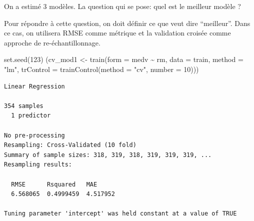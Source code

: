 \documentclass[
  8pt,
  ignorenonframetext,
]{beamer}
\newenvironment{Shaded}{\begin{snugshade}}{\end{snugshade}}
\newcommand{\AttributeTok}[1]{\textcolor[rgb]{0.77,0.63,0.00}{#1}}
\newcommand{\DecValTok}[1]{\textcolor[rgb]{0.00,0.00,0.81}{#1}}
\newcommand{\FunctionTok}[1]{\textcolor[rgb]{0.00,0.00,0.00}{#1}}
\newcommand{\NormalTok}[1]{#1}
\newcommand{\OtherTok}[1]{\textcolor[rgb]{0.56,0.35,0.01}{#1}}
\newcommand{\SpecialCharTok}[1]{\textcolor[rgb]{0.00,0.00,0.00}{#1}}
\newcommand{\StringTok}[1]{\textcolor[rgb]{0.31,0.60,0.02}{#1}}
\begin{document}
\begin{frame}[fragile]
On a estimé 3 modèles. La question qui se pose: quel est le meilleur
modèle ? \pause

Pour répondre à cette question, on doit définir ce que veut dire
``meilleur''. Dans ce cas, on utilisera RMSE comme métrique et la
validation croisée comme approche de re-échantillonnage.

\footnotesize

\begin{Shaded}
\begin{Highlighting}[]
\FunctionTok{set.seed}\NormalTok{(}\DecValTok{123}\NormalTok{)  }
\NormalTok{(cv\_mod1 }\OtherTok{\textless{}{-}} \FunctionTok{train}\NormalTok{(}\AttributeTok{form =}\NormalTok{ medv }\SpecialCharTok{\textasciitilde{}}\NormalTok{ rm, }
  \AttributeTok{data =}\NormalTok{ train, }\AttributeTok{method =} \StringTok{"lm"}\NormalTok{,}
  \AttributeTok{trControl =} \FunctionTok{trainControl}\NormalTok{(}\AttributeTok{method =} \StringTok{"cv"}\NormalTok{, }\AttributeTok{number =} \DecValTok{10}\NormalTok{)))}
\end{Highlighting}
\end{Shaded}

\begin{verbatim}
Linear Regression 

354 samples
  1 predictor

No pre-processing
Resampling: Cross-Validated (10 fold) 
Summary of sample sizes: 318, 319, 318, 319, 319, 319, ... 
Resampling results:

  RMSE      Rsquared   MAE     
  6.568065  0.4999459  4.517952

Tuning parameter 'intercept' was held constant at a value of TRUE
\end{verbatim}

\normalsize
\end{frame}
\end{document}

